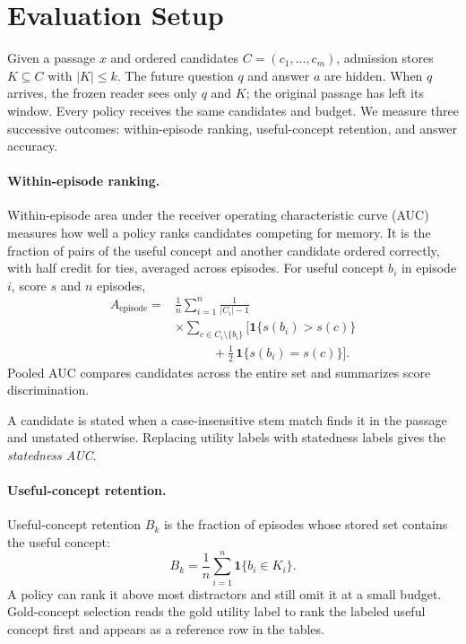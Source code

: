 \section{Evaluation Setup}
\label{sec:setup}
\label{sec:problem}

Given a passage $x$ and ordered candidates $C=(c_1,\ldots,c_m)$,
admission stores $K\subseteq C$ with $|K|\leq k$. The future question
$q$ and answer $a$ are hidden. When $q$ arrives, the frozen reader sees
only $q$ and $K$; the original passage has left its window. Every policy
receives the same candidates and budget. We measure three successive
outcomes: within-episode ranking, useful-concept retention, and answer
accuracy.

\paragraph{Within-episode ranking.}
Within-episode area under the receiver operating characteristic curve
(AUC) measures how well a policy ranks candidates competing for memory.
It is the fraction of pairs of the useful concept and another candidate
ordered correctly, with half credit for ties, averaged across episodes.
For useful concept $b_i$ in episode $i$, score $s$ and $n$ episodes,
\begin{equation}
\begin{split}
A_{\mathrm{episode}}={}&\frac{1}{n}\sum_{i=1}^{n}\frac{1}{|C_i|-1}\\
&\times\sum_{c\in C_i\setminus\{b_i\}}\Big[\mathbf{1}\{s(b_i)>s(c)\}\\
&\qquad\quad+\tfrac12\,\mathbf{1}\{s(b_i)=s(c)\}\Big].
\end{split}
\label{eq:episodeauc}
\end{equation}
Pooled AUC compares candidates across the entire set and summarizes
score discrimination.

A candidate is stated when a case-insensitive stem match finds it in
the passage and unstated otherwise. Replacing utility labels with
statedness labels gives the \emph{statedness AUC}.

\paragraph{Useful-concept retention.}
Useful-concept retention $B_k$ is the fraction of episodes whose stored
set contains the useful concept:
\begin{equation}
B_k=\frac{1}{n}\sum_{i=1}^{n}\mathbf{1}\{b_i\in K_i\}.
\label{eq:retention}
\end{equation}
A policy can rank it above most distractors and still omit it at a
small budget. Gold-concept selection reads the gold utility label to
rank the labeled useful concept first and appears as a reference row
in the tables.

